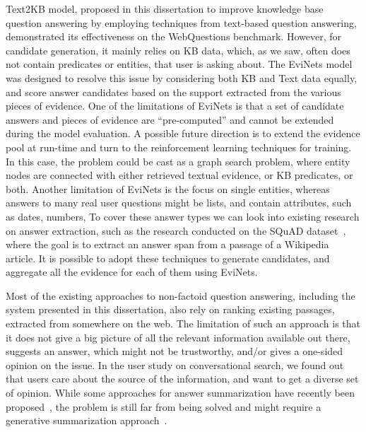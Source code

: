 Text2KB model, proposed in this dissertation to improve knowledge base question answering by employing techniques from text-based question answering, demonstrated its effectiveness on the WebQuestions benchmark.
However, for candidate generation, it mainly relies on KB data, which, as we saw, often does not contain predicates or entities, that user is asking about.
The EviNets model was designed to resolve this issue by considering both KB and Text data equally, and score answer candidates based on the support extracted from the various pieces of evidence.
One of the limitations of EviNets is that a set of candidate answers and pieces of evidence are ``pre-computed'' and cannot be extended during the model evaluation.
A possible future direction is to extend the evidence pool at run-time and turn to the reinforcement learning techniques for training.
In this case, the problem could be cast as a graph search problem, where entity nodes are connected with either retrieved textual evidence, or KB predicates, or both.
Another limitation of EviNets is the focus on single entities, whereas answers to many real user questions might be lists, and contain attributes, such as dates, numbers, \etc
To cover these answer types we can look into existing research on answer extraction, such as the research conducted on the SQuAD dataset~\cite{rajpurkar2016squad}, where the goal is to extract an answer span from a passage of a Wikipedia article.
It is possible to adopt these techniques to generate candidates, and aggregate all the evidence for each of them using EviNets.

Most of the existing approaches to non-factoid question answering, including the system presented in this dissertation, also rely on ranking existing passages, extracted from somewhere on the web.
The limitation of such an approach is that it does not give a big picture of all the relevant information available out there, suggests an answer, which might not be trustworthy, and/or gives a one-sided opinion on the issue.
In the user study on conversational search, we found out that users care about the source of the information, and want to get a diverse set of opinion.
While some approaches for answer summarization have recently been proposed~\cite{song2017summarizing,tomasoni2010metadata,wang2016query}, the problem is still far from being solved and might require a generative summarization approach~\cite{gambhir2017recent,mitra2016distillation}.


